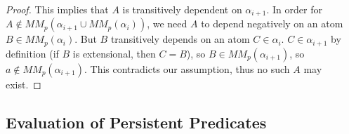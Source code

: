 \begin{proof}
This implies that $A$ is transitively dependent on $\alpha_{i+1}$.  In order
for $A \not\in MM_p(\alpha_{i+1} \cup MM_p(\alpha_i))$, we need $A$ to depend
negatively on an atom $B \in MM_p(\alpha_i)$.  But $B$ transitively depends on
an atom $C \in \alpha_i$.  $C \in \alpha_{i+1}$ by definition (if $B$ is
extensional, then $C=B$), so $B \in MM_p(\alpha_{i+1})$, so $a \not\in
MM_p(\alpha_{i+1})$.  This contradicts our assumption, thus no such $A$ may
exist.
\end{proof}

\subsection{Evaluation of Persistent Predicates}

